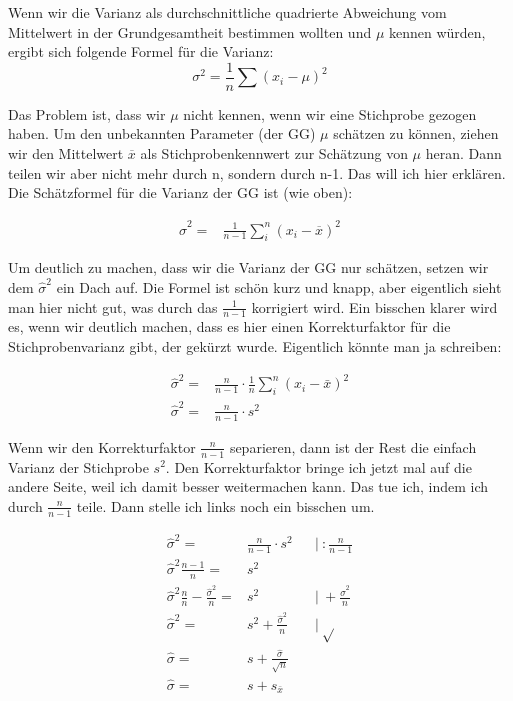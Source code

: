 \documentclass[
  10pt,
  letterpaper,
  a4paper, twoside]{scrreprt}
\begin{document}
\begin{tcolorbox}[enhanced jigsaw, coltitle=black, opacitybacktitle=0.6, toptitle=1mm, colbacktitle=quarto-callout-warning-color!10!white, colback=white, toprule=.15mm, opacityback=0, bottomrule=.15mm, arc=.35mm, colframe=quarto-callout-warning-color-frame, leftrule=.75mm, titlerule=0mm, breakable, left=2mm, rightrule=.15mm, title={IYI: Was das \(\frac{1}{n-1}\) bei der Varianz mit Freiheitsgraden zu
tun hat}, bottomtitle=1mm]

Wenn wir die Varianz als durchschnittliche quadrierte Abweichung vom
Mittelwert in der Grundgesamtheit bestimmen wollten und \(\mu\) kennen
würden, ergibt sich folgende Formel für die Varianz: \[ 
\sigma^2 = \frac{1}{n}\sum{(x_i-\mu)^2}
\]

Das Problem ist, dass wir \(\mu\) nicht kennen, wenn wir eine Stichprobe
gezogen haben. Um den unbekannten Parameter (der GG) \(\mu\) schätzen zu
können, ziehen wir den Mittelwert \(\overline{x}\) als
Stichprobenkennwert zur Schätzung von \(\mu\) heran. Dann teilen wir
aber nicht mehr durch n, sondern durch n-1. Das will ich hier erklären.
Die Schätzformel für die Varianz der GG ist (wie oben):

\begin{align}
 \hat{\sigma}^2 = & \frac{1}{n-1} \sum_i^n(x_i-\overline{x})^2
\end{align}

Um deutlich zu machen, dass wir die Varianz der GG nur schätzen, setzen
wir dem \(\hat{\sigma}^2\) ein Dach auf. Die Formel ist schön kurz und
knapp, aber eigentlich sieht man hier nicht gut, was durch das
\(\frac{1}{n-1}\) korrigiert wird. Ein bisschen klarer wird es, wenn wir
deutlich machen, dass es hier einen Korrekturfaktor für die
Stichprobenvarianz gibt, der gekürzt wurde. Eigentlich könnte man ja
schreiben:

\begin{align}
 \hat{\sigma}^2 = & \frac{n}{n-1} \cdot \frac{1}{n}\sum_i^n(x_i-\bar{x})^2\\ 
 \hat{\sigma}^2 = & \frac{n}{n-1} \cdot s^2
\end{align}

Wenn wir den Korrekturfaktor \(\frac{n}{n-1}\) separieren, dann ist der
Rest die einfach Varianz der Stichprobe \(s^2\). Den Korrekturfaktor
bringe ich jetzt mal auf die andere Seite, weil ich damit besser
weitermachen kann. Das tue ich, indem ich durch \(\frac{n}{n-1}\) teile.
Dann stelle ich links noch ein bisschen um.

\begin{align}
 \hat{\sigma}^2 = & \frac{n}{n-1} \cdot s^2 && |\ :\frac{n}{n-1}\\
 \hat{\sigma}^2 \frac{n-1}{n} = & s^2 \\ 
 \hat{\sigma}^2 \frac{n}{n} - \frac{\hat{\sigma}^2}{n} = & s^2 && |\ + \frac{\hat{\sigma}^2}{n}\\
 \hat{\sigma}^2 = & s^2 + \frac{\hat{\sigma}^2}{n} && |\ \sqrt{} \\
 \hat{\sigma} = & s + \frac{\hat{\sigma}}{\sqrt{n}} \\
 \hat{\sigma} = & s + s_{\bar{x}}
\end{align}


\end{tcolorbox}
\end{document}
